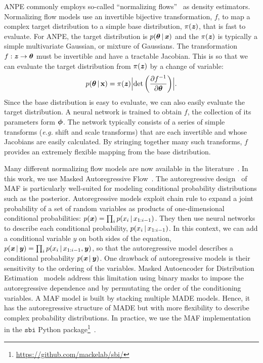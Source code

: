 ANPE commonly employs so-called ``normalizing flows''~\citep{tabak2010,
tabak2013} as density estimators.
Normalizing flow models use an invertible bijective transformation, $f$, to map
a complex target distribution to a simple base distribution, $\pi(\textbf{\textit{z}})$, that is
fast to evaluate.
For ANPE, the target distribution is $p(\boldsymbol{\theta} \,|\, \textbf{\textit{x}})$ and the
$\pi(\textbf{\textit{z}})$ is typically a simple multivariate Gaussian, or mixture of Gaussians.
The transformation $f: \textbf{\textit{z}} \rightarrow \boldsymbol{\theta}$ must be invertible and have a
tractable Jacobian. 
This is so that we can evaluate the target distribution from $\pi(\textbf{\textit{z}})$ by
a change of variable:  
\begin{equation} \label{eq:normflow}
    p(\btheta \given {\bf x}) = \pi(\bfi{z}) \Bigl|{\rm det} \left(\frac{\partial
    f^{-1}}{\partial \btheta} \right)\Bigr|.
\end{equation} 
Since the base distribution is easy to evaluate, we can also easily evaluate
the target distribution.  
A neural network is trained to obtain $f$, the collection of its parameters form $\boldsymbol{\phi}$.
The network typically consists of a series of simple transforms (\emph{e.g.}
shift and scale transforms) that are each invertible and whose Jacobians are
easily calculated. 
By stringing together many such transforms, $f$ provides an extremely flexible
mapping from the base distribution.

Many different normalizing flow models are now available in the
literature~\citep[\emph{e.g.}][]{germain2015, durkan2019}.
In this work, we use Masked Autoregressive
Flow~\citep[MAF;][]{papamakarios2017}. 
The autoregressive design~\citep{uria2016} of MAF is particularly well-suited
for modeling conditional probability distributions such as the posterior. 
Autoregressive models exploit chain rule to expand a joint probability of a set
of random variables as products of one-dimensional conditional
probabilities: $p(\textbf{\textit{x}}) = \prod_i p(x_i\,|\, x_{1:i-1})$. 
They then use neural networks to describe each conditional probability,
$p(x_i\,|\, x_{1:i-1})$. 
In this context, we can add a conditional variable $y$ on both sides of the
equation, $p(\textbf{\textit{x}}\,|\, \textbf{\textit{y}}) = \prod_i p(x_i\,|\, x_{1:i-1}, \textbf{\textit{y}})$, so that the
autoregressive model describes a conditional probability $p(\textbf{\textit{x}}\,|\, \textbf{\textit{y}})$. 
One drawback of autoregressive models is their sensitivity to the ordering of
the variables. 
Masked Autoencoder for Distribution Estimation~\citep[MADE;][]{germain2015}
models address this limitation using binary masks to impose the autoregressive
dependence and by permutating the order of the conditioning variables.
A MAF model is built by stacking multiple MADE models.  
Hence, it has the autoregressive structure of MADE but with more flexibility to
describe complex probability distributions.  
In practice, we use the MAF implementation in the $\mathtt{sbi}$ Python
package\footnote{\url{https://github.com/mackelab/sbi/}}~\citep{greenberg2019,
tejero-cantero2020}.
